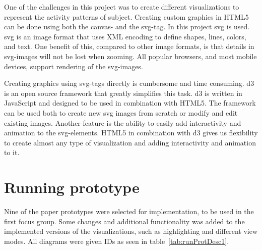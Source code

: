 One of the challenges in this project was to create different visualizations to represent the activity patterns of subject. Creating custom graphics in HTML5 can be done using both the canvas- and the svg-tag. In this project \gls{svg} is used. \gls{svg} is an image format that uses XML encoding to define shapes, lines, colors, and text. One benefit of this, compared to other image formats, is that details in \gls{svg}-images will not be lost when zooming. All popular browsers, and most mobile devices, support rendering of the \gls{svg}-images.

Creating graphics using svg-tags directly is cumbersome and time consuming. \gls{d3} is an open source framework that greatly simplifies this task. \gls{d3} is written in JavaScript and designed to be used in combination with HTML5. The framework can be used both to create new \gls{svg} images from scratch or modify and edit existing images. Another feature is the ability to easily add interactivity and animation to the \gls{svg}-elements. HTML5 in combination with \gls{d3} gives us flexibility to create almost any type of visualization and adding interactivity and animation to it.

\section{Running prototype}
Nine of the paper prototypes were selected for implementation, to be used in the first focus group. Some changes and additional functionality was added to the implemented versions of the visualizations, such as highlighting and different view modes. All diagrams were given IDs as seen in table~\ref{tab:runProtDesc1}.

